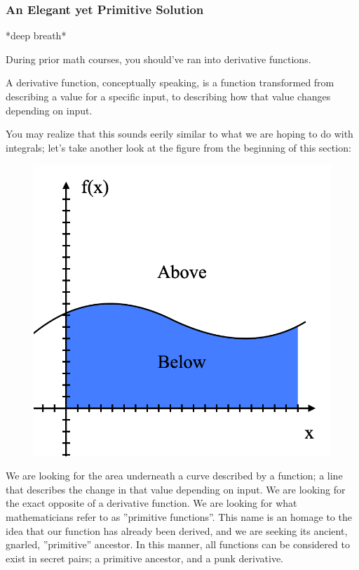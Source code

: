 \subsubsection{An Elegant yet Primitive Solution}
*deep breath*

During prior math courses, you should've ran into derivative functions.

A derivative function, conceptually speaking, is a function transformed from describing a value for a specific input, to describing how that value changes depending on input.

You may realize that this sounds eerily similar to what we are hoping to do with integrals; let's take another look at the figure from the beginning of this section:

\begin{figure}[h!]
    \centering
    \includegraphics[scale= 0.3]{Images/integralGraph.png}
    \caption{}
    \label{integralgraph}
\end{figure}

We are looking for the area underneath a curve described by a function; a line that describes the change in that value depending on input. We are looking for the exact opposite of a derivative function. We are looking for what mathematicians refer to as ''primitive functions''. This name is an homage to the idea that our function has already been derived, and we are seeking its ancient, gnarled, ''primitive'' ancestor. In this manner, all functions can be considered to exist in secret pairs; a primitive ancestor, and a punk derivative.

